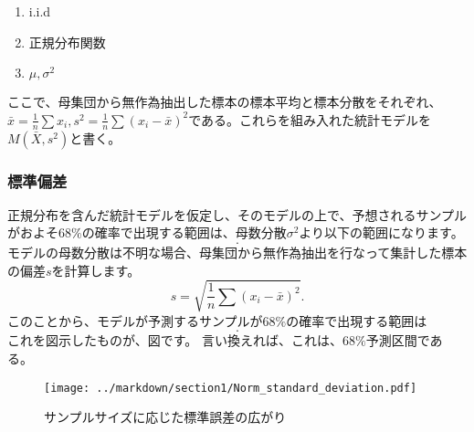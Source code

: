 \documentclass[a4paper,11pt,dvipdfmx]{jsarticle}
\begin{document}
\begin{enumerate}
    \item i.i.d
    \item 正規分布関数
    \item $\mu,\sigma^2$
\end{enumerate}
ここで、母集団から無作為抽出した標本の標本平均と標本分散をそれぞれ、$\bar{x}=\frac{1}{n}\sum{x_i},s^2=\frac{1}{n}\sum(x_i-\bar{x})^2$である。これらを組み入れた統計モデルを$M(\bar{X},s^2)$と書く。

\subsubsection{標準偏差}
正規分布を含んだ統計モデルを仮定し、そのモデルの上で、予想されるサンプルがおよそ$68\%$の確率で出現する範囲は、母数分散$\sigma^2$より以下の範囲になります。
\begin{equation*}
    [\mu-\sigma,\mu+\sigma].
\end{equation*}
モデルの母数分散は不明な場合、母集団から無作為抽出を行なって集計した標本の偏差$s$を計算します。
\begin{equation*}
    s = \sqrt{\frac{1}{n}\sum(x_i-\bar{x})^2}.
\end{equation*}
このことから、モデルが予測するサンプルが$68\%$の確率で出現する範囲は
\begin{equation*}
    [\mu-s,\mu+s].
\end{equation*}
これを図示したものが、図です。
言い換えれば、これは、$68\%$予測区間である。


\begin{figure}
    \begin{center}
        \texttt{[image: ../markdown/section1/Norm\_standard\_deviation.pdf]}
        \caption{サンプルサイズに応じた標準誤差の広がり}
    \end{center}
\end{figure}
\end{document}
